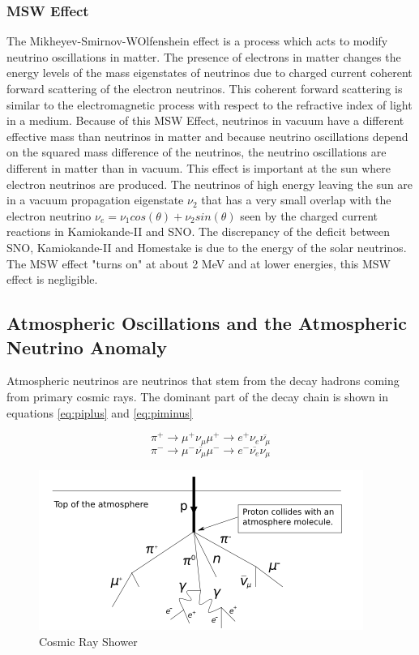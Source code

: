 \subsubsection{MSW Effect}
The Mikheyev-Smirnov-WOlfenshein effect is a process which acts to modify neutrino oscillations in matter. The presence of electrons in matter changes the energy levels of the mass eigenstates of neutrinos due to charged current coherent forward scattering of the electron neutrinos. This coherent forward scattering is similar to the electromagnetic process with respect to the refractive index of light in a medium. Because of this MSW Effect, neutrinos in vacuum have a different effective mass than neutrinos in matter and because neutrino oscillations depend on the squared mass difference of the neutrinos, the neutrino oscillations are different in matter than in vacuum. This effect is important at the sun where electron neutrinos are produced. The neutrinos of high energy leaving the sun are in a vacuum propagation eigenstate $\nu_{2}$ that has a very small overlap with the electron neutrino $\nu_{e}=\nu_{1}cos(\theta)+\nu_{2}sin(\theta)$ seen by the charged current reactions in Kamiokande-II and SNO. The discrepancy of the deficit between SNO, Kamiokande-II and Homestake is due to the energy of the solar neutrinos. The MSW effect "turns on" at about 2 MeV and at lower energies, this MSW effect is negligible. \cite{Smirnov:2003da}



\subsection{Atmospheric Oscillations and the Atmospheric Neutrino Anomaly}
Atmospheric neutrinos are neutrinos that stem from the decay hadrons coming from primary cosmic rays. The dominant part of the decay chain is shown in equations  \ref{eq:piplus} and \ref{eq:piminus}

\begin{equation}
\label{eq:piplus}
\pi^{+} \rightarrow \mu^{+} \nu_{\mu} \mu^{+} \rightarrow e^{+} \nu_{e} \overline{\nu_{\mu}}
\end{equation}
\begin{equation}
\label{eq:piminus}
\pi^{-} \rightarrow \mu^{-} \overline{\nu_{\mu}} \mu^{-} \rightarrow e^{-} \overline{\nu_{e}} \nu_{\mu}
\end{equation}

\begin{figure}[htp]
\centering
\includegraphics[scale=.5]{figs/cosmicray.jpg}
\caption{Cosmic Ray Shower}
\label{fig:cosmicray}
\end{figure}

